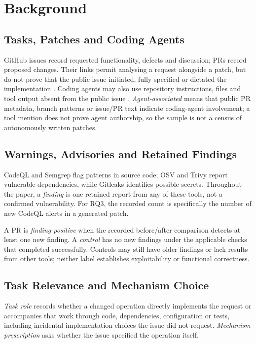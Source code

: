 \documentclass[acmsmall,screen,nonacm]{acmart}
\begin{document}
\section{Background}

\subsection{Tasks, Patches and Coding Agents}

GitHub issues record requested functionality, defects and discussion; PRs record proposed changes. Their links permit analysing a request alongside a patch, but do not prove that the public issue initiated, fully specified or dictated the implementation \cite{b5}. Coding agents may also use repository instructions, files and tool output absent from the public issue \cite{b20,b22}. \emph{Agent-associated} means that public PR metadata, branch patterns or issue/PR text indicate coding-agent involvement; a tool mention does not prove agent authorship, so the sample is not a census of autonomously written patches.

\subsection{Warnings, Advisories and Retained Findings}

CodeQL and Semgrep flag patterns in source code; OSV and Trivy report vulnerable dependencies, while Gitleaks identifies possible secrets. Throughout the paper, a \emph{finding} is one retained report from any of these tools, not a confirmed vulnerability. For RQ3, the recorded count is specifically the number of new CodeQL alerts in a generated patch.

A PR is \emph{finding-positive} when the recorded before/after comparison detects at least one new finding. A \emph{control} has no new findings under the applicable checks that completed successfully. Controls may still have older findings or lack results from other tools; neither label establishes exploitability or functional correctness.

\subsection{Task Relevance and Mechanism Choice}

\emph{Task role} records whether a changed operation directly implements the request or accompanies that work through code, dependencies, configuration or tests, including incidental implementation choices the issue did not request. \emph{Mechanism prescription} asks whether the issue specified the operation itself.
\end{document}
